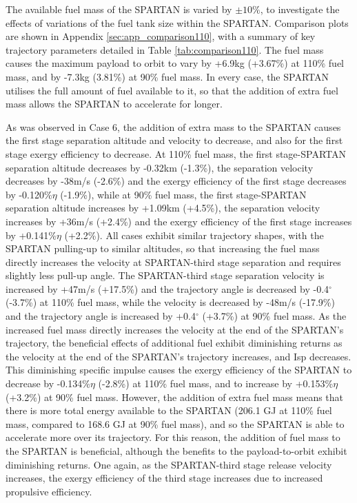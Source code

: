 The available fuel mass of the SPARTAN is varied by $\pm 10\%$, to investigate the effects of variations of the fuel tank size within the SPARTAN. Comparison plots are shown in Appendix \ref{sec:app_comparison110}, with a summary of key trajectory parameters detailed in Table \ref{tab:comparison110}.
The fuel mass causes the maximum payload to orbit to vary by +6.9kg (+3.67\%) at 110\% fuel mass, and by -7.3kg (3.81\%) at 90\% fuel mass. 
 In every case, the SPARTAN utilises the full amount of fuel available to it, so that the addition of extra fuel mass allows the SPARTAN to accelerate for longer. 

 As was observed in Case 6, the addition of extra mass to the SPARTAN causes the first stage separation altitude and velocity to decrease, and also for the first stage exergy efficiency to decrease. At 110\% fuel mass, the first stage-SPARTAN separation altitude decreases by -0.32km (-1.3\%), the separation velocity decreases by -38m/s (-2.6\%) and the exergy efficiency of the first stage decreases by -0.120\%$\eta$ (-1.9\%), while at 90\% fuel mass, the first stage-SPARTAN separation altitude increases by +1.09km (+4.5\%), the separation velocity increases by +36m/s (+2.4\%) and the exergy efficiency of the first stage increases by +0.141\%$\eta$ (+2.2\%).
All cases exhibit similar trajectory shapes, with the SPARTAN pulling-up to similar altitudes, so that increasing the fuel mass directly increases the velocity at SPARTAN-third stage separation and requires slightly less pull-up angle. The SPARTAN-third stage separation velocity is increased by +47m/s (+17.5\%) and the trajectory angle is decreased by -0.4$^\circ$ (-3.7\%) at 110\% fuel mass, while the velocity is decreased by -48m/s (-17.9\%) and the trajectory angle is increased by +0.4$^\circ$ (+3.7\%) at 90\% fuel mass. 
As the increased fuel mass directly increases the velocity at the end of the SPARTAN's trajectory, the beneficial effects of additional fuel exhibit diminishing returns as the velocity at the end of the SPARTAN's trajectory increases, and Isp decreases.
This diminishing specific impulse causes the exergy efficiency of the SPARTAN to decrease by -0.134\%$\eta$ (-2.8\%) at 110\% fuel mass, and to increase by +0.153\%$\eta$ (+3.2\%) at 90\% fuel mass. 
However, the addition of extra fuel mass means that there is more total energy available to the SPARTAN (206.1 GJ at 110\% fuel mass, compared to 168.6 GJ at 90\% fuel mass), and so the SPARTAN is able to accelerate more over its trajectory. For this reason, the addition of fuel mass to the SPARTAN is beneficial, although the benefits to the payload-to-orbit exhibit diminishing returns. 
One again, as the SPARTAN-third stage release velocity increases, the exergy efficiency of the third stage increases due to increased propulsive efficiency. 


